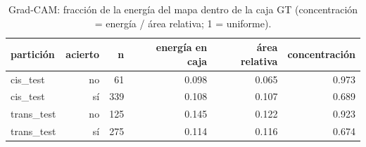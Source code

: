 \begin{table}[!htbp]
\centering
\small
\caption{Grad-CAM: fracción de la energía del mapa dentro de la caja GT (concentración = energía / área relativa; 1 = uniforme).}
\label{tab:gradcam}
\begin{tabular}{lrrrrr}
\toprule
partición & acierto & n & energía en caja & área relativa & concentración \\
\midrule
cis\_test & no & 61 & 0.098 & 0.065 & 0.973 \\
cis\_test & sí & 339 & 0.108 & 0.107 & 0.689 \\
trans\_test & no & 125 & 0.145 & 0.122 & 0.923 \\
trans\_test & sí & 275 & 0.114 & 0.116 & 0.674 \\
\bottomrule
\end{tabular}
\end{table}
